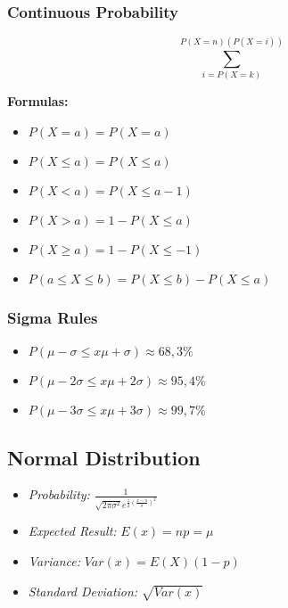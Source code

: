 \subsubsection{Continuous Probability}

\[
    \sum_{i = P(X=k)}^{P(X=n) (P(X=i))}
\]

\textbf{Formulas: }

\begin{itemize}

    \item \(P(X = a) = P(X = a)\)

    \item \(P(X \le a) = P(X \le a)\)

    \item \(P(X < a) = P(X \le a - 1)\)

    \item \(P(X > a) = 1 - P(X \le a)\)

    \item \(P(X \ge a) = 1 - P(X \le - 1)\)

    \item \(P(a \le X \le b) = P(X \le b) - P(X \le a)\)

\end{itemize}

\subsubsection{Sigma Rules}

\begin{itemize}[label = \(-\)]

    \item \(P(\mu - \sigma \le x \mu + \sigma) \approx 68,3\%\)

    \item \(P(\mu - 2\sigma \le x \mu + 2\sigma) \approx 95,4\%\)

    \item \(P(\mu - 3\sigma \le x \mu + 3\sigma) \approx 99,7\%\)

\end{itemize}

\subsection{Normal Distribution}

\begin{itemize}
    
    \item \emph{Probability: } \(\frac{1}{\sqrt{2\pi \sigma^2} e^{\frac{1}{2} 
          {\left(\frac{x - u}{\sigma}\right)}^2}}\)
    
    \item \emph{Expected Result: } \(E(x) = np = \mu\)
    
    \item \emph{Variance: } \(Var(x) = E(X) (1-p)\)
    
    \item \emph{Standard Deviation: } \(\sqrt{Var(x)}\)

\end{itemize}

